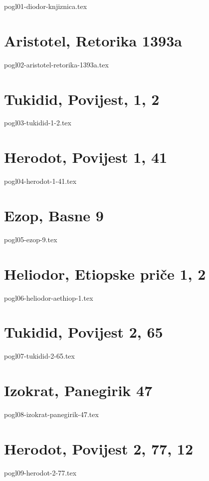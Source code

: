 \documentclass[a4paper,12pt,twoside]{report}
\begin{document}
{pogl01-diodor-knjiznica.tex}

\chapter{Aristotel, Retorika 1393a}

{pogl02-aristotel-retorika-1393a.tex}

\chapter{Tukidid, Povijest, 1, 2}

{pogl03-tukidid-1-2.tex}

\chapter{Herodot, Povijest 1, 41}

{pogl04-herodot-1-41.tex}

\chapter{Ezop, Basne 9}

{pogl05-ezop-9.tex}

\chapter{Heliodor, Etiopske priče 1, 2}

{pogl06-heliodor-aethiop-1.tex}

\chapter{Tukidid, Povijest 2, 65}

{pogl07-tukidid-2-65.tex}

\chapter{Izokrat, Panegirik 47}

{pogl08-izokrat-panegirik-47.tex}

\chapter{Herodot, Povijest 2, 77, 12}

{pogl09-herodot-2-77.tex}
\end{document}
